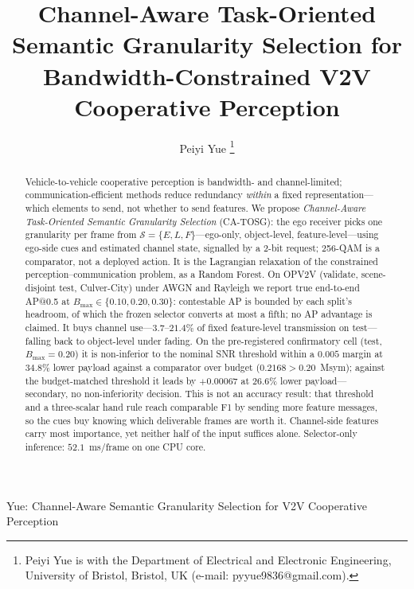 \documentclass[journal]{IEEEtran}
\newcommand{\method}{CA-TOSG}
\begin{document}
\title{Channel-Aware Task-Oriented Semantic Granularity Selection for Bandwidth-Constrained V2V Cooperative Perception}

\author{
Peiyi Yue%
\thanks{Peiyi Yue is with the Department of Electrical and Electronic Engineering, University of Bristol, Bristol, UK (e-mail: pyyue9836@gmail.com).}
}

{Yue: Channel-Aware Semantic Granularity Selection for V2V Cooperative Perception}

\maketitle

\begin{abstract}
Vehicle-to-vehicle cooperative perception is bandwidth- and channel-limited; communication-efficient methods reduce redundancy \emph{within} a fixed representation---which elements to send, not whether to send features. We propose \emph{Channel-Aware Task-Oriented Semantic Granularity
Selection} (\method): the ego receiver picks one granularity per frame from
$\mathcal{S}=\{E,L,F\}$---ego-only, object-level, feature-level---using ego-side cues and estimated channel state, signalled by a $2$-bit request; 256-QAM is a comparator, not a
deployed action. It is the Lagrangian relaxation of the constrained perception--communication problem, as a Random Forest. On OPV2V (validate, scene-disjoint test, Culver-City) under AWGN
and Rayleigh we report true end-to-end AP@0.5 at
$B_{\max}\in\{0.10,0.20,0.30\}$: contestable AP is bounded by each split's headroom, of which the frozen selector converts at most a fifth; no AP advantage is claimed. It buys channel use---$3.7$--$21.4\%$ of fixed feature-level
transmission on test---falling back to object-level under fading. On the pre-registered confirmatory cell (test, $B_{\max}=0.20$) it is
non-inferior to the nominal SNR threshold within a $0.005$ margin at $34.8\%$ lower payload against a comparator over budget ($0.2168>0.20$~Msym); against the budget-matched threshold
it leads by $+0.00067$ at $26.6\%$ lower payload---secondary, no non-inferiority decision.
This is not an accuracy result: that threshold and a three-scalar hand rule reach comparable F1 by
sending more feature messages, so the cues buy knowing which deliverable frames are worth it.
Channel-side features carry most importance, yet neither half of the input suffices alone.
Selector-only inference: $52.1$~ms/frame on one CPU core.
\end{abstract}
\end{document}
